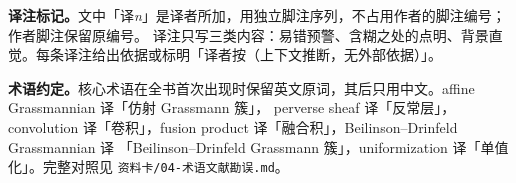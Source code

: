 \documentclass[UTF8, a4paper, 12pt, fontset=fandol, scheme=chinese]{ctexart}
\begin{document}
\textbf{译注标记。}文中「译\emph{n}」是译者所加，用独立脚注序列，不占用作者的脚注编号；作者脚注保留原编号。
译注只写三类内容：易错预警、含糊之处的点明、背景直觉。每条译注给出依据或标明「译者按（上下文推断，无外部依据）」。

\textbf{术语约定。}核心术语在全书首次出现时保留英文原词，其后只用中文。affine Grassmannian 译「仿射 Grassmann 簇」，
perverse sheaf 译「反常层」，convolution 译「卷积」，fusion product 译「融合积」，Beilinson–Drinfeld Grassmannian 译
「Beilinson–Drinfeld Grassmann 簇」，uniformization 译「单值化」。完整对照见 \verb|资料卡/04-术语文献勘误.md|。

\newpage
\tableofcontents
\newpage
























\clearpage
{}
{}

\end{document}
